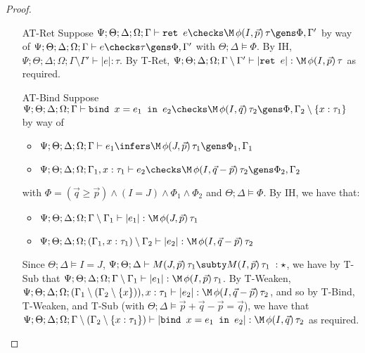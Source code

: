 \begin{proof}
\begin{enumerate}
  \item[AT-Ret] Suppose $\Psi ; \Theta ; \Delta ; \Omega ; \Gamma \vdash \texttt{ret } e \checks \M \, \phi(I,\vec{p}) \, \tau \gens \Phi, \Gamma'$ by way of $\Psi ; \Theta ; \Delta ; \Omega ; \Gamma \vdash e \checks \tau \gens \Phi,\Gamma'$ with $\Theta ; \Delta \vDash \Phi$. By IH, $\Psi ; \Theta ; \Delta ; \Omega ; \Gamma \setminus \Gamma' \vdash |e| : \tau$. By T-Ret, $\Psi ; \Theta ; \Delta ; \Omega ; \Gamma \setminus \Gamma' \vdash |\texttt{ret } e| : \M \, \phi(I,\vec{p}) \, \tau$  as required.
  
  \item[AT-Bind] Suppose $\Psi ; \Theta ; \Delta ; \Omega ; \Gamma \vdash \texttt{bind } x = e_1 \texttt{ in } e_2 \checks \M \, \phi(I,\vec{q})\, \tau_2 \gens \Phi, \Gamma_2 \setminus \{x : \tau_1\}$ by way of
  \begin{itemize}
    \item $\Psi ; \Theta ; \Delta ; \Omega ; \Gamma \vdash e_1 \infers \M \, \phi(J,\vec{p})\, \tau_1 \gens \Phi_1,\Gamma_1$
    \item $\Psi ; \Theta; \Delta ; \Omega ; \Gamma_1, x:\tau_1 \vdash e_2 \checks \M \, \phi(I,\vec{q} - \vec{p})\, \tau_2 \gens \Phi_2,\Gamma_2$
  \end{itemize}
  with $\Phi = (\vec{q} \geq \vec{p}) \wedge (I =J)  \wedge \Phi_1 \wedge \Phi_2$ and $\Theta ; \Delta \vDash \Phi$. By IH, we have that:
  \begin{itemize}
    \item $\Psi ; \Theta ; \Delta ; \Omega ; \Gamma \setminus \Gamma_1 \vdash |e_1| : \M \, \phi(J,\vec{p})\, \tau_1$
    \item $\Psi ; \Theta; \Delta ; \Omega ; (\Gamma_1, x:\tau_1) \setminus \Gamma_2 \vdash |e_2| : \M \, \phi(I,\vec{q} - \vec{p})\, \tau_2$
  \end{itemize}
  Since $\Theta ; \Delta \vDash I = J$, $\Psi ; \Theta ; \Delta \vdash M(J,\vec{p})\, \tau_1 \subty M(I,\vec{p}) \, \tau_1 \; : \star$, we have by T-Sub that
  $\Psi ; \Theta ; \Delta ; \Omega ; \Gamma \setminus \Gamma_1 \vdash |e_1| : \M \, \phi(I,\vec{p})\, \tau_1$. By T-Weaken,
  $\Psi ; \Theta; \Delta ; \Omega ; (\Gamma_1 \setminus (\Gamma_2 \setminus \{x\})), x:\tau_1 \vdash |e_2| : \M \, \phi(I,\vec{q} - \vec{p})\, \tau_2$, and so by T-Bind, T-Weaken, and T-Sub (with $\Theta ; \Delta \vDash \vec{p} + \vec{q} - \vec{p} = \vec{q}$), we have that
  $\Psi ; \Theta ; \Delta ; \Omega ; \Gamma \setminus (\Gamma_2 \setminus \{x : \tau_1\}) \vdash |\texttt{bind } x = e_1 \texttt{ in } e_2| : \M \, \phi(I,\vec{q})\, \tau_2$ as required.
  

\end{enumerate}
\end{proof}
